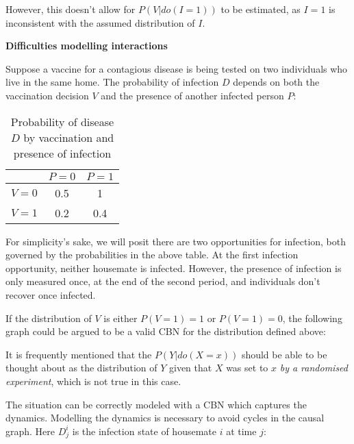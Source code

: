 However, this doesn't allow for $P(V|do(I=1))$ to be estimated, as $I=1$ is inconsistent with the assumed distribution of $I$.

\textbf{Difficulties modelling interactions}

Suppose a vaccine for a contagious disease is being tested on two individuals who live in the same home. The probability of infection $D$ depends on both the vaccination decision $V$ and the presence of another infected person $P$:

\begin{table}[h]
    \centering
    \begin{tabular}{c|c|c}
        & $P=0$ & $P=1$ \\
         \hline
        $V=0$ & 0.5 & 1 \\
        $V=1$ & 0.2 & 0.4
    \end{tabular}
    \caption{Probability of disease $D$ by vaccination and presence of infection}
    \label{tab:vaccination_interaction}
\end{table}

For simplicity's sake, we will posit there are two opportunities for infection, both governed by the probabilities in the above table. At the first infection opportunity, neither housemate is infected. However, the presence of infection is only measured once, at the end of the second period, and individuals don't recover once infected.

If the distribution of $V$ is either $P(V=1)=1$ or $P(V=1)=0$, the following graph could be argued to be a valid CBN for the distribution defined above:

\begin{center}
\end{center}

It is frequently mentioned that the $P(Y|do(X=x))$ should be able to be thought about as the distribution of $Y$ given that $X$ was set to $x$ \emph{by a randomised experiment}, which is not true in this case.

The situation can be correctly modeled with a CBN which captures the dynamics. Modelling the dynamics is necessary to avoid cycles in the causal graph. Here $D^i_j$ is the infection state of housemate $i$ at time $j$:

